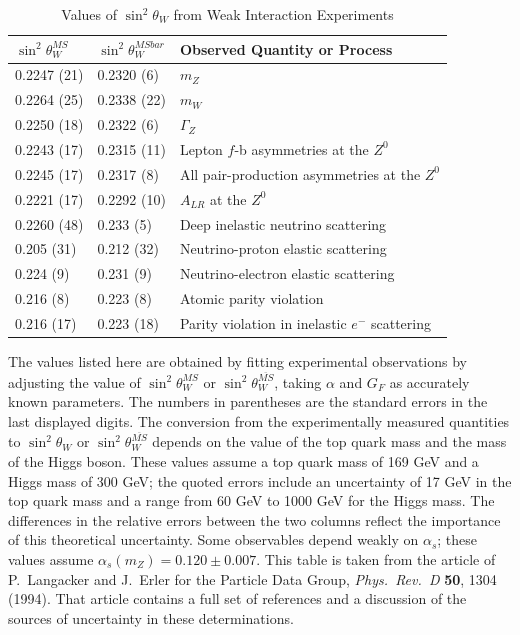 \begin{table}[t]
  \centering
  \caption{Values of $\sin^2\theta_W$ from Weak Interaction Experiments}
  \begin{tabular}{lll}
    \toprule
    $\sin^2\theta^{MS}_W$ & $\sin^2\theta^{MSbar}_W$ & Observed Quantity or
      Process\\
    \midrule
    0.2247 (21) & 0.2320 (6) & $m_Z$\\
    0.2264 (25) & 0.2338 (22) & $m_W$\\
    0.2250 (18) & 0.2322 (6) & $\Gamma_Z$\\
    0.2243 (17) & 0.2315 (11) & Lepton $f$-b asymmetries at the $Z^0$\\
    0.2245 (17) & 0.2317 (8) & All pair-production asymmetries at the $Z^0$\\
    0.2221 (17) & 0.2292 (10) & $A_{LR}$ at the $Z^0$\\
    0.2260 (48) & 0.233 (5) & Deep inelastic neutrino scattering\\
    0.205 (31) & 0.212 (32) & Neutrino-proton elastic scattering\\
    0.224 (9) & 0.231 (9) & Neutrino-electron elastic scattering\\
    0.216 (8) & 0.223 (8) & Atomic parity violation\\
    0.216 (17) & 0.223 (18) & Parity violation in inelastic $e^{-}$
      scattering\\
    \bottomrule
  \end{tabular}
  \label{tab:20.1}
\end{table}

The values listed here are obtained by fitting experimental observations by
adjusting the value of $\sin^2\theta^{MS}_W$ or $\sin^2\theta^{\overline{MS}}_W$,
taking $\alpha$ and $G_F$ as accurately known parameters.  The numbers in
parentheses are the standard errors in the last displayed digits.  The
conversion from the experimentally measured quantities to
$\sin^2\theta_W$ or $\sin^2\theta^{\overline{MS}}_W$ depends on the value of
the top quark mass and the mass of the Higgs boson.  These values assume a
top quark mass of 169 GeV and a Higgs mass of 300 GeV; the quoted errors
include an uncertainty of 17 GeV in the top quark mass and a range from
60 GeV to 1000 GeV for the Higgs mass.  The differences in the relative
errors between the two columns reflect the importance of this theoretical
uncertainty.  Some observables depend weakly on $\alpha_s$; these values
assume $\alpha_s(m_Z) = 0.120 \pm 0.007$.  This table is taken from the
article of P.~Langacker and J.~Erler for the Particle Data Group,
\emph{Phys.\ Rev.\ D} \textbf{50}, 1304 (1994).  That article contains a full
set of references and a discussion of the sources of uncertainty in these
determinations.

